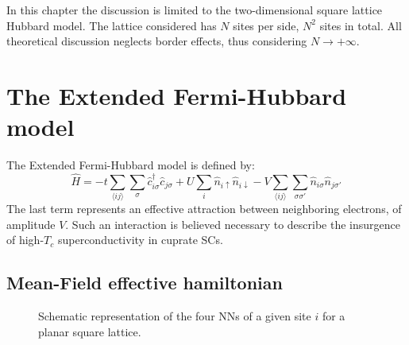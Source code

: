 In this chapter the discussion is limited to the two-dimensional square lattice Hubbard model. The lattice considered has $N$ sites per side, $N^2$ sites in total. All theoretical discussion neglects border effects, thus considering $N \to +\infty$.

\section{The Extended Fermi-Hubbard model}

The Extended Fermi-Hubbard model is defined by:
\begin{equation}\label{eq:extended-hubbard-model}
	\hat H =
	-t \sum_{\langle ij \rangle} \sum_\sigma \hat c_{i\sigma}^\dagger \hat c_{j\sigma}
	+ U \sum_i \hat n_{i\uparrow} \hat n_{i\downarrow}
	- V \sum_{\langle ij \rangle} \sum_{\sigma \sigma'} \hat n_{i\sigma} \hat n_{j\sigma'}
\end{equation}
The last term represents an effective attraction between neighboring electrons, of amplitude $V$. Such an interaction is believed \cite{cao2025p-wave} necessary to describe the insurgence of high-$T_c$ superconductivity in cuprate SCs. \todo

\subsection{Mean-Field effective hamiltonian}

\begin{figure}
	\centering
	
	\caption{Schematic representation of the four NNs of a given site $i$ for a planar square lattice.}
	\label{fig:square-nearest-neighbors}
\end{figure}

